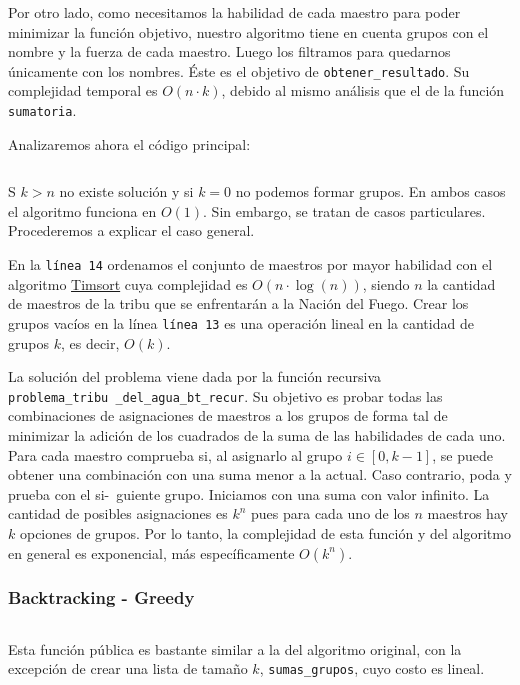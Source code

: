 \documentclass{article}
\begin{document}
Por otro lado, como necesitamos la habilidad de cada maestro para poder minimizar la función objetivo, nuestro algoritmo tiene en cuenta grupos con el nombre y la fuerza de cada maestro. Luego los filtramos para quedarnos únicamente con los nombres. Éste es el objetivo de \texttt{obtener\_resultado}. Su complejidad temporal es $O(n \cdot k)$, debido al mismo análisis que el de la función \texttt{sumatoria}.

Analizaremos ahora el código principal:
\inputminted[linenos, firstline=1, lastline=45]{python}{codigo/backtracking.py}

S $k > n$ no existe solución y si $k = 0$ no podemos formar grupos. En ambos casos el algoritmo funciona en $O(1)$. Sin embargo, se tratan de casos particulares. Procederemos a explicar el caso general.

En la \texttt{línea 14} ordenamos el conjunto de maestros por mayor habilidad con el algoritmo \href{https://svn.python.org/projects/python/trunk/Objects/listsort.txt}{Timsort} cuya complejidad es $O(n \cdot \log(n))$, siendo $n$ la cantidad de maestros de la tribu que se enfrentarán a la Nación del Fuego. Crear los grupos vacíos en la línea \texttt{línea 13} es una operación lineal en la cantidad de grupos $k$, es decir, $O(k)$. 

La solución del problema viene dada por la función recursiva \texttt{problema\_tribu\
\_del\_agua\_bt\_recur}. Su objetivo es probar todas las combinaciones de asignaciones de maestros a los grupos de forma tal de minimizar la adición de los cuadrados de la suma de las habilidades de cada uno. Para cada maestro comprueba si, al asignarlo al grupo $i \in [0, k-1]$, se puede obtener una combinación con una suma menor a la actual. Caso contrario, poda y prueba con el si-\ guiente grupo. Iniciamos con una suma con valor infinito. La cantidad de posibles asignaciones es $k^n$ pues para cada uno de los $n$ maestros hay $k$ opciones de grupos. Por lo tanto, la complejidad de esta función y del algoritmo en general es exponencial, más específicamente $O(k^n)$.

\subsubsection{Backtracking - Greedy}
\label{sec:bt-greedy}

\inputminted[linenos, firstline=3, lastline=27]{python}{codigo/backtracking_con_greedy.py}

Esta función pública es bastante similar a la del algoritmo original, con la excepción de crear una lista de tamaño $k$, \texttt{sumas\_grupos}, cuyo costo es lineal.
\end{document}
